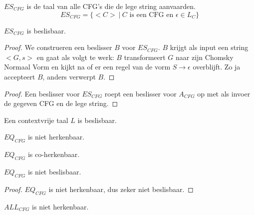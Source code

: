 \documentclass[main.tex]{subfiles}
\begin{document}
\begin{de}
  \label{de:es-cfg}
  $ES_{CFG}$ is de taal van alle CFG's die de lege string aanvaarden.
  \[ ES_{CFG} = \{ <C> \ |\ C \text{ is een CFG en } \epsilon \in L_{C}\} \]
\end{de}

\begin{st}
  \label{st:es-cfg-besl}
  $ES_{CFG}$ is beslisbaar.

  \begin{proof}
    We construeren een beslisser $B$ voor $ES_{CFG}$.
    $B$ krijgt als input een string $<G,s>$ en gaat als volgt te werk:
    $B$ transformeert $G$ naar zijn Chomsky Normaal Vorm en kijkt na of er een regel van de vorm $S \rightarrow \epsilon$ overblijft.
    Zo ja accepteert $B$, anders verwerpt $B$.
  \end{proof}

  \begin{proof}
    Een beslisser voor $ES_{CFG}$ roept een beslisser voor $A_{CFG}$ op met als invoer de gegeven CFG en de lege string.
  \end{proof}
\end{st}

\begin{st}
  \label{st:contextvrije-taal-besl}
  Een contextvrije taal $L$ is beslisbaar.

\end{st}

\begin{st}
  \label{st:eq-cfg-niet-herk}
  $EQ_{CFG}$ is niet herkenbaar.
\end{st}

\begin{st}
  \label{st:eq-cfg-coherk}
  $EQ_{CFG}$ is co-herkenbaar.
\end{st}

\begin{gev}
  \label{gev:eq-cfg-niet-besl}
  $EQ_{CFG}$ is niet beslisbaar.

  \begin{proof}
    $EQ_{CFG}$ is niet herkenbaar, dus zeker niet beslisbaar.
  \end{proof}
\end{gev}

\begin{st}
  \label{st:all-cfg-niet-herk}
  $ALL_{CFG}$ is niet herkenbaar. \zb
\end{st}
\end{document}
